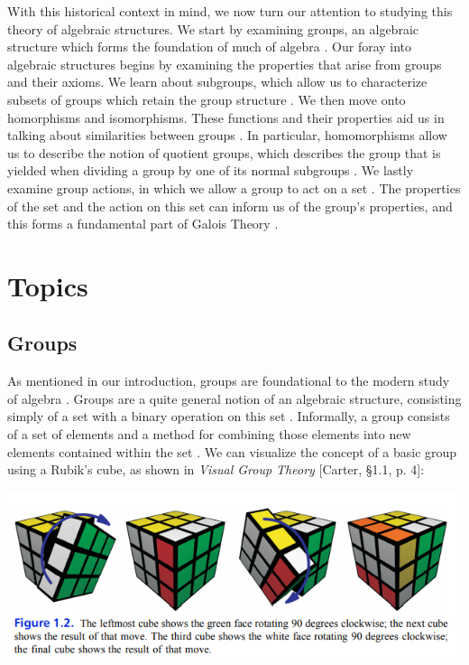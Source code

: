 \documentclass[11pt, reqno]{amsart}
\theoremstyle{plain}
\theoremstyle{definition}
\theoremstyle{example}
\begin{document}
\par
With this historical context in mind, we now turn our attention to studying this theory of algebraic structures. We start by examining groups, an algebraic structure which forms the foundation of much of algebra \cite{dummit, pinter}. Our foray into algebraic structures begins by examining the properties that arise from groups and their axioms. We learn about subgroups, which allow us to characterize subsets of groups which retain the group structure \cite{dummit, pinter, carter}. We then move onto homorphisms and isomorphisms. These functions and their properties aid us in talking about similarities between groups \cite{dummit}. In particular, homomorphisms allow us to describe the notion of quotient groups, which describes the group that is yielded when dividing a group by one of its normal subgroups \cite{dummit, carter}. We lastly examine group actions, in which we allow a group to act on a set \cite{dummit}. The properties of the set and the action on this set can inform us of the group's properties, and this forms a fundamental part of Galois Theory \cite{dummit}.

\newpage

\section{Topics}

\subsection{Groups}

\par
As mentioned in our introduction, groups are foundational to the modern study of algebra \cite{dummit, abstractwiki}. Groups are a quite general notion of an algebraic structure, consisting simply of a set with a binary operation on this set \cite{groupwiki}. Informally, a group consists of a set of elements and a method for combining those elements into new elements contained within the set \cite{pinter, carter}. We can visualize the concept of a basic group using a Rubik's cube, as shown in \textit{Visual Group Theory} [Carter, \S 1.1, p. 4]:

\includegraphics[scale=1]{rubiks}
\end{document}
